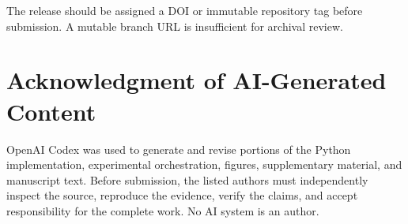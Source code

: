 \documentclass[conference]{IEEEtran}
\begin{document}
The release should be assigned a DOI or immutable repository tag before submission. A mutable branch URL is insufficient for archival review.

\section*{Acknowledgment of AI-Generated Content}
OpenAI Codex was used to generate and revise portions of the Python implementation, experimental orchestration, figures, supplementary material, and manuscript text. Before submission, the listed authors must independently inspect the source, reproduce the evidence, verify the claims, and accept responsibility for the complete work. No AI system is an author.
\end{document}
